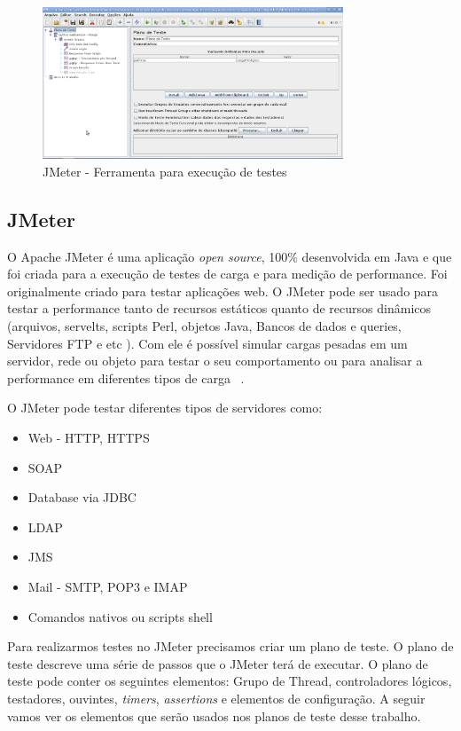 	\begin{figure}[!htbp]
		\begin{center}
			\includegraphics[width=0.8\textwidth]{jmeter}
		\end{center}
		\caption{JMeter - Ferramenta para execução de testes ~\cite{siteJmeter}}
		\label{fig:jmeter}
	\end{figure}


\subsection{JMeter}

O Apache JMeter é uma aplicação \textit{open source}, 100\% desenvolvida em Java e que foi criada para a execução de testes de carga e para medição de performance. Foi originalmente criado para testar aplicações web. O JMeter pode ser usado para testar a performance tanto de recursos estáticos quanto de recursos dinâmicos  (arquivos, servelts, scripts Perl, objetos Java, Bancos de dados e queries, Servidores FTP e etc ). Com ele é possível simular cargas pesadas em um servidor, rede ou objeto para testar o seu comportamento ou para analisar a performance em diferentes tipos de carga ~\cite{siteJmeter}.

O JMeter pode testar diferentes tipos de servidores como:

\begin{itemize}
\item Web - HTTP, HTTPS
\item SOAP
\item Database via JDBC
\item LDAP
\item JMS
\item Mail - SMTP, POP3 e IMAP
\item Comandos nativos ou scripts shell
\end{itemize}

Para realizarmos testes no JMeter precisamos criar um plano de teste. O plano de teste descreve uma série de passos que o JMeter terá de executar. O plano de teste pode conter os seguintes elementos: Grupo de Thread, controladores lógicos, testadores, ouvintes, \textit{timers}, \textit{assertions} e elementos de configuração. A seguir vamos ver os elementos que serão usados nos planos de teste desse trabalho.

